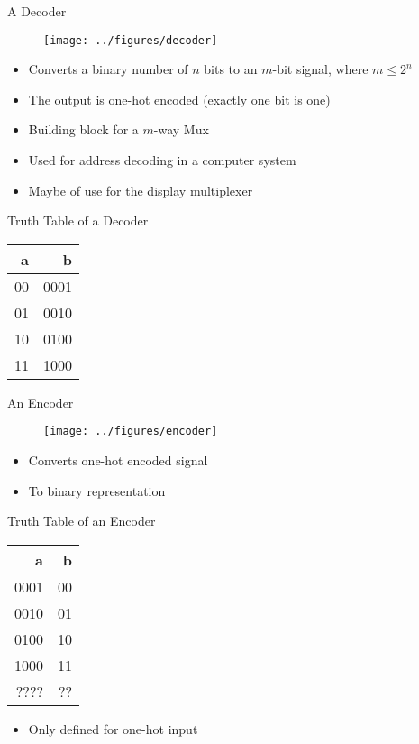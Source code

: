 \begin{frame}[fragile]{A Decoder}
\begin{figure}
  \texttt{[image: ../figures/decoder]}
\end{figure}
\begin{itemize}
\item Converts a binary number of $n$ bits to an $m$-bit signal, where $m \leq 2^n$
\item The output is one-hot encoded (exactly one bit is one)
\item Building block for a $m$-way Mux
\item Used for address decoding in a computer system
\item Maybe of use for the display multiplexer
\end{itemize}
\end{frame}

\begin{frame}[fragile]{Truth Table of a Decoder}
\begin{table}
  \begin{tabular}{rr}
    \toprule
    a & b \\
    \midrule
    00 & 0001 \\
    01 & 0010 \\
    10 & 0100 \\
    11 & 1000 \\
    \bottomrule
  \end{tabular}
\end{table}
\end{frame}

\begin{frame}[fragile]{An Encoder}
\begin{figure}
  \texttt{[image: ../figures/encoder]}
\end{figure}
\begin{itemize}
\item Converts one-hot encoded signal
\item To binary representation
\end{itemize}
\end{frame}

\begin{frame}[fragile]{Truth Table of an Encoder}
\begin{table}
  \begin{tabular}{rr}
    \toprule
    a & b \\
    \midrule
    0001 & 00 \\
    0010 & 01 \\
    0100 & 10 \\
    1000 & 11 \\
    ???? & ?? \\
    \bottomrule
  \end{tabular}
\end{table}
\begin{itemize}
\item Only defined for one-hot input
\end{itemize}
\end{frame}

